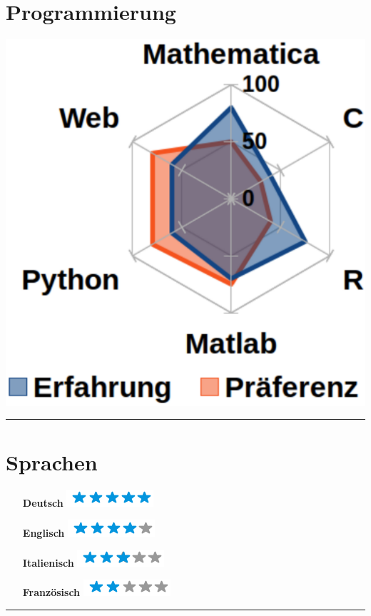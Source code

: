 \documentclass{article}
\begin{document}
\begin{minipage}[t]{0.3\textwidth}
    \section*{\fontsize{18pt}{24pt}\selectfont \color{pblue} Programmierung}
	\vspace{-2mm}
	\includegraphics[scale=0.3]{img/programmierung.pdf}
	\vspace{2mm}
	\hrule
	\vspace{-2mm}
	\section*{\fontsize{18pt}{24pt}\selectfont \color{pblue} Sprachen}
	\vspace{-2mm}
	\begin{itemize}
	\centering
	\item[\textbf{Deutsch}] \includegraphics[scale=0.50]{img/5stars.png}\vspace{-2mm}
	\item[\textbf{Englisch}]  \includegraphics[scale=0.50]{img/4stars.png}\vspace{-2mm}
    \item[\textbf{Italienisch}] \includegraphics[scale=0.5]{img/3stars.png}\vspace{-2mm}
    \item[\textbf{Französisch}]  \includegraphics[scale=0.50]{img/2stars.png}
    \end{itemize}
	\hrule
	\vspace{-2mm}

\end{minipage}
\end{document}

